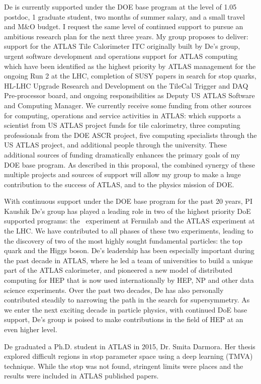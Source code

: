 
De is currently supported under the DOE base program at the level of 1.05 postdoc, 1 graduate student, two months of summer salary, and a small travel and M\&O budget. I request the same level of continued support to pursue an ambitious research plan for the next three years. My group proposes to deliver: support for the ATLAS Tile Calorimeter ITC originally built by De's group, urgent software development and operations support for ATLAS computing which have been identified as the highest priority by ATLAS management for the ongoing Run 2 at the LHC, completion of SUSY papers in search for stop quarks, HL-LHC Upgrade Research and Development on the TileCal Trigger and DAQ Pre-processor board, and ongoing responsibilities as Deputy US ATLAS Software and Computing Manager. We currently receive some funding from other sources for computing, operations and service activities in ATLAS: which supports a scientist from US ATLAS project funds for tile calorimetry, three computing professionals from the DOE ASCR project, five computing specialists through the US ATLAS project, and additional people through the university. These additional sources of funding dramatically enhances the primary goals of my DOE base program. As described in this proposal, the combined synergy of these multiple projects and sources of support will allow my group to make a huge contribution to the success of ATLAS, and to the physics mission of DOE.

With continuous support under the DOE base program for the past 20 years, PI Kaushik De's group has played a leading role in two of the highest priority DoE supported programs: the \ experiment at Fermilab and the ATLAS experiment at the LHC. We have contributed to all phases of these two experiments, leading to the discovery of two of the most highly sought fundamental particles: the top quark and the Higgs boson. De's leadership has been especially important during the past decade in ATLAS, where he led a team of universities to build a unique part of the ATLAS calorimeter, and pioneered a new model of distributed computing for HEP that is now used internationally by HEP, NP and other data science experiments. Over the past two decades, De has also personally contributed steadily to narrowing the path in the search for supersymmetry. As we enter the next exciting decade in particle physics, with continued DoE base support, De's group is poised to make contributions in the field of HEP at an even higher level.

De graduated a Ph.D. student in ATLAS in 2015, Dr. Smita Darmora. Her thesis explored difficult regions in stop parameter space using a deep learning (TMVA) technique. While the stop was not found, stringent limits were places and the results were included in ATLAS published papers.

